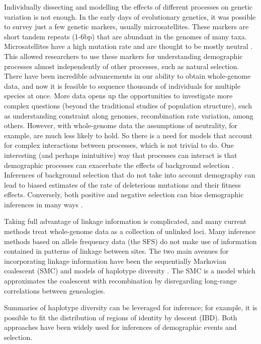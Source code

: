 Individually dissecting and modelling the effects of different processes on genetic variation is not enough.
In the early days of evolutionary genetics, it was possible to survey just a few genetic markers, usually microsatellites.
These markers are short tandem repeats (1-6bp) that are abundant in the genomes of many taxa.
Microsatellites have a high mutation rate and are thought to be mostly neutral \citep{field_long_1997}.
This allowed researchers to use these markers for understanding demographic processes almost independently of other processes, such as natural selection.
There have been incredible advancements in our ability to obtain whole-genome data,
and now it is feasible to sequence thousands of individuals for multiple species at once.
More data opens up the opportunities to investigate more complex questions (\ie beyond the traditional studies of population structure),
such as understanding constraint along genomes, recombination rate variation, among others.
However, with whole-genome data the assumptions of neutrality, for example, are much less likely to hold.
So there is a need for models that account for complex interactions between processes, which is not trivial to do.
One interesting (and perhaps inintuitive) way that processes can interact is that demographic processes can exacerbate the effects of background selection \citep{torres_human_2018, torres_temporal_2020}.
Inferences of background selection that do not take into account demography can lead to biased estimates of the rate of deleterious mutations and their fitness effects.
Conversely, both positive and negative selection can bias demographic inferences in many ways \citep{schrider_effects_2016, ewing_consequences_2016, johri_impact_2021}.

Taking full advantage of linkage information is complicated,
and many current methods treat whole-genome data as a collection of unlinked loci.
Many inference methods based on allele frequency data (\ie the SFS) do not make use of information contained in patterns of linkage between sites.
The two main avenues for incorporating linkage information have been the sequentially Markovian coalescent (SMC) and models of haplotype diversity \citep{schraiber_methods_2015}.
The SMC is a model which approximates the coalescent with recombination by disregarding long-range correlations between genealogies.

Summaries of haplotype diversity can be leveraged for inference; for example, it is possible to fit the distribution of regions of identity by descent (IBD).
Both approaches have been widely used for inferences of demographic events and selection.

